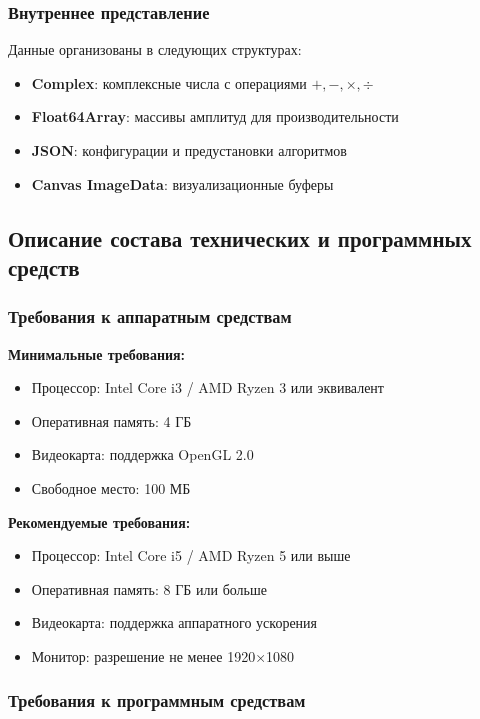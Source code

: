 \documentclass[14pt,russian]{extarticle}
\begin{document}
\subsubsection{Внутреннее представление}

Данные организованы в следующих структурах:
\begin{itemize}
    \item \textbf{Complex}: комплексные числа с операциями $+, -, \times, \div$
    \item \textbf{Float64Array}: массивы амплитуд для производительности
    \item \textbf{JSON}: конфигурации и предустановки алгоритмов
    \item \textbf{Canvas ImageData}: визуализационные буферы
\end{itemize}

\subsection{Описание состава технических и программных средств}

\subsubsection{Требования к аппаратным средствам}

\textbf{Минимальные требования:}
\begin{itemize}
    \item Процессор: Intel Core i3 / AMD Ryzen 3 или эквивалент
    \item Оперативная память: 4 ГБ
    \item Видеокарта: поддержка OpenGL 2.0
    \item Свободное место: 100 МБ
\end{itemize}

\textbf{Рекомендуемые требования:}
\begin{itemize}
    \item Процессор: Intel Core i5 / AMD Ryzen 5 или выше
    \item Оперативная память: 8 ГБ или больше
    \item Видеокарта: поддержка аппаратного ускорения
    \item Монитор: разрешение не менее 1920×1080
\end{itemize}

\subsubsection{Требования к программным средствам}
\end{document}
